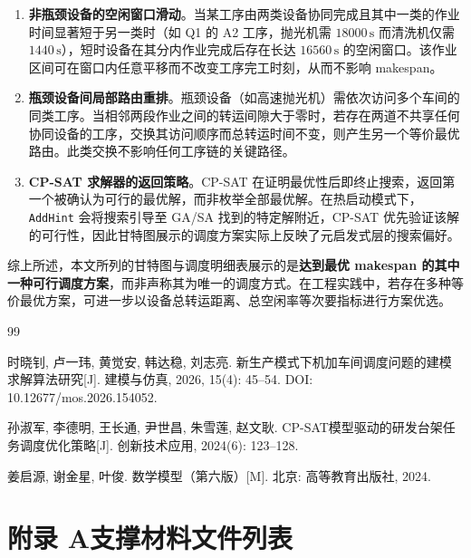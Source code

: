 \documentclass[12pt,a4paper]{ctexart}
\begin{document}
\begin{enumerate}[leftmargin=2.2em, label=(\arabic*)]
\item \textbf{非瓶颈设备的空闲窗口滑动}。当某工序由两类设备协同完成且其中一类的作业时间显著短于另一类时（如 Q1 的 A2 工序，抛光机需 $18000\,\mathrm{s}$ 而清洗机仅需 $1440\,\mathrm{s}$），短时设备在其分内作业完成后存在长达 $16560\,\mathrm{s}$ 的空闲窗口。该作业区间可在窗口内任意平移而不改变工序完工时刻，从而不影响 makespan。

\item \textbf{瓶颈设备间局部路由重排}。瓶颈设备（如高速抛光机）需依次访问多个车间的同类工序。当相邻两段作业之间的转运间隙大于零时，若存在两道不共享任何协同设备的工序，交换其访问顺序而总转运时间不变，则产生另一个等价最优路由。此类交换不影响任何工序链的关键路径。

\item \textbf{CP-SAT 求解器的返回策略}。CP-SAT 在证明最优性后即终止搜索，返回第一个被确认为可行的最优解，而非枚举全部最优解。在热启动模式下，\texttt{AddHint} 会将搜索引导至 GA/SA 找到的特定解附近，CP-SAT 优先验证该解的可行性，因此甘特图展示的调度方案实际上反映了元启发式层的搜索偏好。
\end{enumerate}

\noindent 综上所述，本文所列的甘特图与调度明细表展示的是\textbf{达到最优 makespan 的其中一种可行调度方案}，而非声称其为唯一的调度方式。在工程实践中，若存在多种等价最优方案，可进一步以设备总转运距离、总空闲率等次要指标进行方案优选。

\begin{thebibliography}{99}

时晓钊, 卢一玮, 黄觉安, 韩达稳, 刘志亮.
新生产模式下机加车间调度问题的建模求解算法研究[J].
建模与仿真, 2026, 15(4): 45--54.
DOI: 10.12677/mos.2026.154052.

孙淑军, 李德明, 王长通, 尹世昌, 朱雪莲, 赵文耿.
CP-SAT模型驱动的研发台架任务调度优化策略[J].
创新技术应用, 2024(6): 123--128.

姜启源, 谢金星, 叶俊.
数学模型（第六版）[M].
北京: 高等教育出版社, 2024.

\end{thebibliography}

\appendix

\section{附录 A\quad 支撑材料文件列表}
\end{document}
